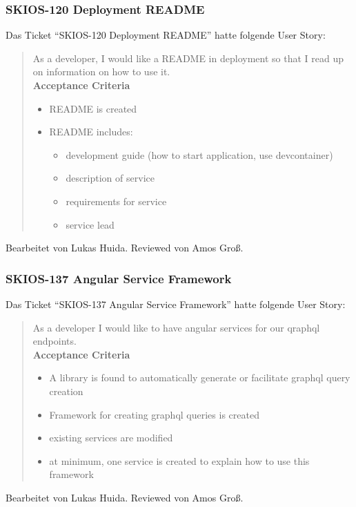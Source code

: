 \subsubsection{SKIOS-120 Deployment README}
Das Ticket \enquote{SKIOS-120 Deployment README} hatte folgende User Story:
\begin{quotation}
    As a developer, I would like a README in deployment so that I read up on information on how to use it. \\
\textbf{Acceptance Criteria}
\begin{itemize}
    \item README is created
    \item README includes:
    \begin{itemize}
        \item development guide (how to start application, use devcontainer)
        \item description of service
        \item requirements for service
        \item service lead
    \end{itemize}
\end{itemize}
\end{quotation}
Bearbeitet von Lukas Huida.
Reviewed von Amos Groß.

\subsubsection{SKIOS-137 Angular Service Framework}
Das Ticket \enquote{SKIOS-137 Angular Service Framework} hatte folgende User Story:
\begin{quotation}
    As a developer I would like to have angular services for our qraphql endpoints. \\
\textbf{Acceptance Criteria}
\begin{itemize}
    \item A library is found to automatically generate or facilitate graphql query creation
    \item Framework for creating graphql queries is created
    \item existing services are modified
    \item at minimum, one service is created to explain how to use this framework
\end{itemize}
\end{quotation}
Bearbeitet von Lukas Huida.
Reviewed von Amos Groß.

